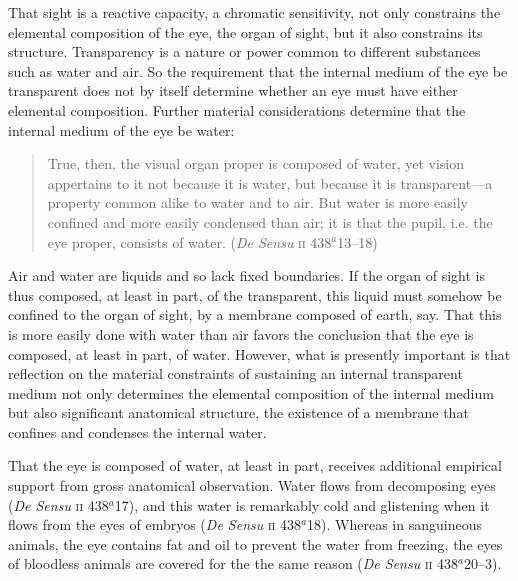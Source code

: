 That sight is a reactive capacity, a chromatic sensitivity, not only constrains the elemental composition of the eye, the organ of sight, but it also constrains its structure. Transparency is a nature or power common to different substances such as water and air. So the requirement that the internal medium of the eye be transparent does not by itself determine whether an eye must have either elemental composition. Further material considerations determine that the internal medium of the eye be water:
\begin{quote}
	True, then, the visual organ proper is composed of water, yet vision appertains to it not because it is water, but because it is transparent---a property common alike to water and to air. But water is more easily confined and more easily condensed than air; it is that the pupil, i.e. the eye proper, consists of water. (\emph{De Sensu} \textsc{ii} 438\( ^{a} \)13--18)
\end{quote}
Air and water are liquids and so lack fixed boundaries. If the organ of sight is thus composed, at least in part, of the transparent, this liquid must somehow be confined to the organ of sight, by a membrane composed of earth, say. That this is more easily done with water than air favors the conclusion that the eye is composed, at least in part, of water. However, what is presently important is that reflection on the material constraints of sustaining an internal transparent medium not only determines the elemental composition of the internal medium but also significant anatomical structure, the existence of a membrane that confines and condenses the internal water.

That the eye is composed of water, at least in part, receives additional empirical support from gross anatomical observation. Water flows from decomposing eyes (\emph{De Sensu} \textsc{ii} 438\( ^{a} \)17), and this water is remarkably cold and glistening when it flows from the eyes of embryos (\emph{De Sensu} \textsc{ii} 438\( ^{a} \)18). Whereas in sanguineous animals, the eye contains fat and oil to prevent the water from freezing, the eyes of bloodless animals are covered for the the same reason (\emph{De Sensu} \textsc{ii} 438\( ^{a} \)20--3).


